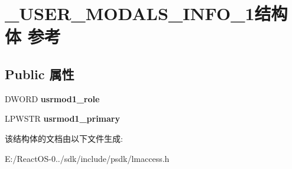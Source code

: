 \hypertarget{struct___u_s_e_r___m_o_d_a_l_s___i_n_f_o__1}{}\section{\+\_\+\+U\+S\+E\+R\+\_\+\+M\+O\+D\+A\+L\+S\+\_\+\+I\+N\+F\+O\+\_\+1结构体 参考}
\label{struct___u_s_e_r___m_o_d_a_l_s___i_n_f_o__1}
\subsection*{Public 属性}
\begin{DoxyCompactItemize}
\item 
\mbox{\label{struct___u_s_e_r___m_o_d_a_l_s___i_n_f_o__1_ada42a064a5231a5838bdf6d436eac64d}} 
D\+W\+O\+RD {\bfseries usrmod1\+\_\+role}
\item 
\mbox{\label{struct___u_s_e_r___m_o_d_a_l_s___i_n_f_o__1_ae58d516a2a1cf90846aebae8efc6a8f7}} 
L\+P\+W\+S\+TR {\bfseries usrmod1\+\_\+primary}
\end{DoxyCompactItemize}


该结构体的文档由以下文件生成\+:\begin{DoxyCompactItemize}
\item 
E\+:/\+React\+O\+S-\/0../sdk/include/psdk/lmaccess.\+h\end{DoxyCompactItemize}
